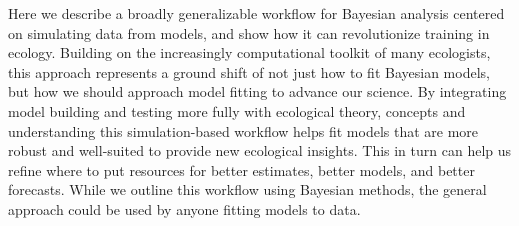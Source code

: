 \documentclass[11pt]{article}
\begin{document}
{Here we describe a broadly generalizable workflow for Bayesian analysis centered on simulating data from models, and show how it can revolutionize training in ecology. Building on the increasingly computational toolkit of many ecologists, this approach represents a ground shift of not just how to fit Bayesian models, but how we should approach model fitting to advance our science.  By integrating model building and testing more fully with ecological theory,
  concepts and understanding this simulation-based workflow helps fit models that are more robust and well-suited to provide new ecological insights. This in turn can help us refine where to put resources for better estimates, better models, and better forecasts. While we outline this workflow using Bayesian methods, the general approach could be used by anyone fitting models to data.

}
\end{document}
